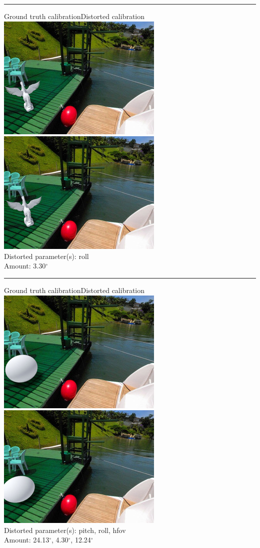 \begin{minipage}{\linewidth}
\centering
\hrule\vspace{1em}
Ground truth calibration\hspace{0.2\linewidth}Distorted calibration\
\includegraphics[width=0.45\linewidth]{study/thumb/pano_ahxngxlbcrplaw-6_1_gt.jpg}
\includegraphics[width=0.45\linewidth]{study/thumb/pano_ahxngxlbcrplaw-6_1_dc.jpg}\\
Distorted parameter(s): roll\\
Amount: 3.30$^\circ$
\end{minipage}

\begin{minipage}{\linewidth}
\centering
\hrule\vspace{1em}
Ground truth calibration\hspace{0.2\linewidth}Distorted calibration\\\vspace{0.5em}
\includegraphics[width=0.45\linewidth]{study/thumb/pano_ahxngxlbcrplaw-6_2_gt.jpg}
\includegraphics[width=0.45\linewidth]{study/thumb/pano_ahxngxlbcrplaw-6_2_dc.jpg}\\
Distorted parameter(s): pitch, roll, hfov\\
Amount: 24.13$^\circ$, 4.30$^\circ$, 12.24$^\circ$
\end{minipage}

